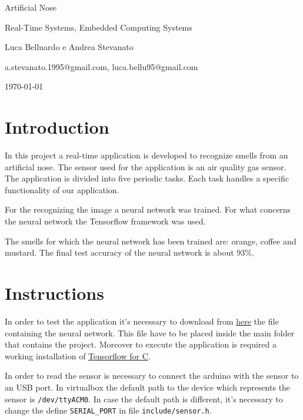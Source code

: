 \documentclass[12pt]{article}
\begin{document}
\begin{titlepage}
    \centering
	\Huge Artificial Nose\par
	\vspace{1cm}
	\Large Real-Time Systems, Embedded Computing Systems\par
	\vspace{1.5cm}
    \Large Luca Belluardo e Andrea Stevanato\par
    \vspace{1cm}
    \large a.stevanato.1995@gmail.com, luca.bellu95@gmail.com\par
    \large 
	\vfill
	{\large \today\par}
\end{titlepage}

\section{Introduction}
In this project a real-time application is developed to recognize smells from an
artificial nose. The sensor used for the application is an air quality gas 
sensor. The application is divided into five periodic tasks. Each task handles
a specific functionality of our application.

For the recognizing the image a neural network was trained. For what concerns
the neural network the Tensorflow framework was used.

The smells for which the neural network has been trained are: orange, coffee
and mustard. The final test accuracy of the neural network is about $93\%$.

\section{Instructions}
In order to test the application it's necessary to download from
\href{https://drive.google.com/open?id=1qDOYy3bR72UthGocy0de_JqHhydha3PY}{here}
the file containing the neural network. This file have to be placed inside
the main folder that contains the project. Moreover to execute the
application is required a working installation of
\href{https://www.tensorflow.org/install/lang_c}{Tensorflow for C}.

In order to read the sensor is necessary to connect the arduino with the
sensor to an USB port. In virtualbox the default path to the device which
represents the sensor is \texttt{/dev/ttyACM0}. In case the default path is
different, it's necessary to change the define \texttt{SERIAL\_PORT} in file
\texttt{include/sensor.h}.
\end{document}
